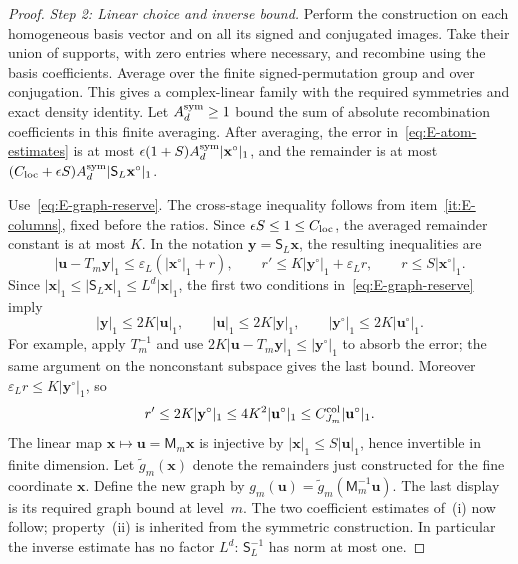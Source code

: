 \begin{proof}
\emph{Step 2: Linear choice and inverse bound.}
Perform the construction on each homogeneous basis vector and on all its signed and conjugated images. Take their union of supports, with zero entries where necessary, and recombine using the basis coefficients. Average over the finite signed-permutation group and over conjugation. This gives a complex-linear family with the required symmetries and exact density identity. Let $A_d^{\rm sym}\ge1$ bound the sum of absolute recombination coefficients in this finite averaging. After averaging, the error in~\eqref{eq:E-atom-estimates} is at most $\epsilon(1+S)A_d^{\rm sym}|\mathbf x^\circ|_1$, and the remainder is at most $(C_{\rm loc}+\epsilon S)A_d^{\rm sym}|\mathsf S_L\mathbf x^\circ|_1$.

Use~\eqref{eq:E-graph-reserve}. The cross-stage inequality follows from item~\ref{it:E-columns}, fixed before the ratios. Since $\epsilon S\le1\le C_{\rm loc}$, the averaged remainder constant is at most $K$. In the notation $\mathbf y=\mathsf S_L\mathbf x$, the resulting inequalities are
\begin{equation*}
 |\mathbf u-T_m\mathbf y|_1\le \varepsilon_L(|\mathbf x^\circ|_1+r),\qquad
 r'\le K|\mathbf y^\circ|_1+\varepsilon_L r,\qquad r\le S|\mathbf x^\circ|_1.
\end{equation*}
Since $|\mathbf x|_1\le|\mathsf S_L\mathbf x|_1\le L^d|\mathbf x|_1$, the first two conditions in~\eqref{eq:E-graph-reserve} imply
\begin{equation*}
 |\mathbf y|_1\le2K|\mathbf u|_1,\qquad |\mathbf u|_1\le2K|\mathbf y|_1,
 \qquad |\mathbf y^\circ|_1\le2K|\mathbf u^\circ|_1.
\end{equation*}
For example, apply $T_m^{-1}$ and use
$2K|\mathbf u-T_m\mathbf y|_1\le|\mathbf y^\circ|_1$ to absorb the error; the same argument on the nonconstant subspace gives the last bound. Moreover $\varepsilon_L r\le K|\mathbf y^\circ|_1$, so
\begin{equation*}
 r'\le2K|\mathbf y^\circ|_1\le4K^2|\mathbf u^\circ|_1
 \le C^{\rm col}_{J_m}|\mathbf u^\circ|_1.
\end{equation*}
The linear map $\mathbf x\mapsto\mathbf u=\mathsf M_m\mathbf x$ is injective by $|\mathbf x|_1\le S|\mathbf u|_1$, hence invertible in finite dimension. Let $\widetilde g_m(\mathbf x)$ denote the remainders just constructed for the fine coordinate $\mathbf x$. Define the new graph by $g_m(\mathbf u)=\widetilde g_m(\mathsf M_m^{-1}\mathbf u)$. The last display is its required graph bound at level~$m$. The two coefficient estimates of~(i) now follow; property~(ii) is inherited from the symmetric construction. In particular the inverse estimate has no factor $L^d$: $\mathsf S_L^{-1}$ has norm at most one.


\end{proof}
